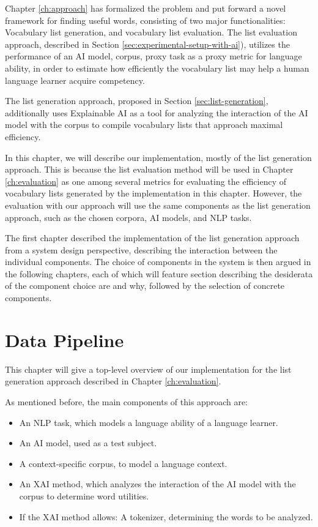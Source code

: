 Chapter \ref{ch:approach} has formalized the problem and put forward a novel framework for finding useful words, consisting of two major functionalities:
Vocabulary list generation, and vocabulary list evaluation.
The list evaluation approach, described in Section \ref{sec:experimental-setup-with-ai}), utilizes the performance of an AI model, corpus, proxy task as a proxy metric for language ability, in order to estimate how efficiently the vocabulary list may help a human language learner acquire competency.

The list generation approach, proposed in Section \ref{sec:list-generation}, additionally uses Explainable AI as a tool for analyzing the interaction of the AI model with the corpus to compile vocabulary lists that approach maximal efficiency.

In this chapter, we will describe our implementation, mostly of the list generation approach.
This is because the list evaluation method will be used in Chapter \ref{ch:evaluation} as one among several metrics for evaluating the efficiency of vocabulary lists generated by the implementation in this chapter.
However, the evaluation with our approach will use the same components as the list generation approach, such as the chosen corpora, AI models, and NLP tasks.

The first chapter described the implementation of the list generation approach from a system design perspective, describing the interaction between the individual components.
The choice of components in the system is then argued in the following chapters, each of which will feature section describing the desiderata of the component choice are and why, followed by the selection of concrete components.

\section{Data Pipeline}

This chapter will give a top-level overview of our implementation for the list generation approach described in Chapter \ref{ch:evaluation}.

As mentioned before, the main components of this approach are:

\begin{itemize}
	\item An NLP task, which models a language ability of a language learner.
	\item An AI model, used as a test subject.
	\item A context-specific corpus, to model a language context.
	\item An XAI method, which analyzes the interaction of the AI model with the corpus to determine word utilities.
	\item If the XAI method allows: A tokenizer, determining the words to be analyzed.
\end{itemize}

